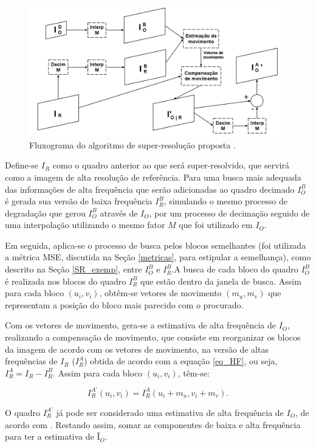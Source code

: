 \begin{figure}[h]
	\centering
	\includegraphics[scale=0.30]{figuras/fluxo_super_resolucao.png}
	\caption{Fluxograma do algoritmo de super-resolução proposta \cite{garcia2013tecnicas}.}
	\label{fig:algoritmo_proposto}
\end{figure}

Define-se  $I_R$ como o quadro anterior ao que será super-resolvido, que servirá como a imagem de alta resolução de referência. Para uma busca mais adequada das informações de alta frequência que serão adicionadas ao quadro decimado $I_O^B$ é gerada sua versão de baixa frequência $I_R^B$, simulando o mesmo processo de degradação que gerou $I_O^B$ através de $I_O$,  por um processo de decimação seguido de uma interpolação utilizando o mesmo fator $M$ que foi utilizado em $I_O$.

     Em seguida, aplica-se o processo de busca pelos blocos semelhantes (foi utilizada a métrica MSE, discutida na Seção \ref{metricas}, para estipular a semelhança), como descrito na Seção \ref{SR_exemp}, entre $I_O^B$ e $I_R^B$.A busca de cada bloco do quadro $I_O^B$ é realizada nos blocos do quadro $I_R^B$ que estão dentro da janela de busca. Assim para cada bloco $(u_i,v_i)$, obtêm-se vetores de movimento $(m_u,m_v)$ que representam a posição do bloco mais parecido  com o procurado. 

Com os vetores de movimento, gera-se a estimativa de alta frequência de $I_O$, realizando a compensação de movimento, que consiste em reorganizar os blocos da imagem de acordo com os vetores de movimento, na versão de altas frequências de $I_R$ ($I_R^{A}$) obtida de acordo com a equação \ref{eq_HF}, ou seja, $I_R^{A} = I_R - I_R^B$. Assim para cada bloco $(u_i,v_i)$, têm-se:


\begin{equation}
I_R^{A’} (u_i,v_i) = I_R^A(u_i+m_u, v_i+m_v).
\end{equation}


O quadro $I_R^{A’} $ já pode ser considerado uma estimativa de alta frequência de $I_O$, de acordo com \cite{garcia2013tecnicas}. Restando assim, somar as componentes de baixa e alta frequência para ter a estimativa de $Î_O$.

